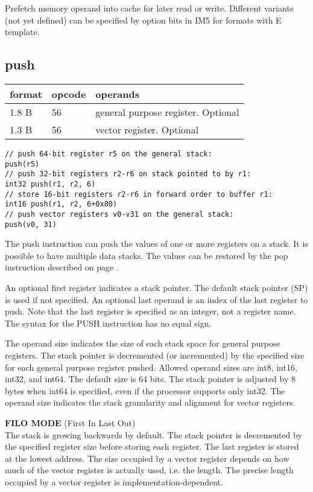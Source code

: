 \documentclass[forwardcom.tex]{subfiles}
\begin{document}
Prefetch memory operand into cache for later read or write.
Different variants (not yet defined) can be specified by option bits in IM5 for formats with E template.
\vv


\subsection{push}
\label{table:pushInstruction}
\begin{tabular}{|p{12mm}|p{15mm}|p{100mm}|}
\hline
\bfseries format & \bfseries opcode & \bfseries operands \\ \hline
1.8 B & 56 & general purpose register. Optional \\ 
1.3 B & 56 & vector register. Optional \\ \hline
\end{tabular}
\vv

\begin{lstlisting}[frame=none]
// push 64-bit register r5 on the general stack:
push(r5)
// push 32-bit registers r2-r6 on stack pointed to by r1:
int32 push(r1, r2, 6)
// store 16-bit registers r2-r6 in forward order to buffer r1:
int16 push(r1, r2, 6+0x80)
// push vector registers v0-v31 on the general stack:
push(v0, 31)
\end{lstlisting}
\vv

The push instruction can push the values of one or more registers on a stack. It is possible to have multiple data stacks. 
The values can be restored by the pop instruction described on page \pageref{table:popInstruction}.
\vv

An optional first register indicates a stack pointer. The default stack pointer (SP) is used if not specified. An optional last operand is an index of the last register to push. Note that the last register is specified as an integer, not a register name. The syntax for the PUSH instruction has no equal sign.
\vv

The operand size indicates the size of each stack space for general purpose registers. The stack pointer is decremented (or incremented) by the specified size for each general purpose register pushed. Allowed operand sizes are int8, int16, int32, and int64. The default size is 64 bits. The stack pointer is adjusted by 8 bytes when int64 is specified, even if the processor supports only int32. The operand size indicates the stack granularity and alignment for vector registers.
\vv

\textbf{FILO MODE} (First In Last Out) \\
The stack is growing backwards by default. 
The stack pointer is decremented by the specified register size before storing each register. The last register is stored at the lowest address. 
The size occupied by a vector register depends on how much of the vector register is actually used, i.e. the length. The precise length occupied by a vector register is implementation-dependent.
\vv
 
\end{document}
